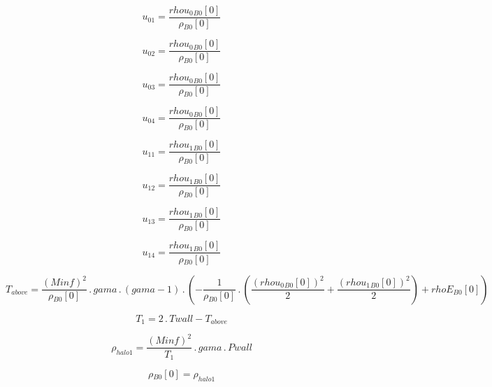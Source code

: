 \documentclass{article}
\begin{document}
\begin{dmath}u_{01} = \frac{{rhou_{0}{_{B0}}}[{0}]}{{\rho{_{B0}}}[{0}]}\end{dmath}

\begin{dmath}u_{02} = \frac{{rhou_{0}{_{B0}}}[{0}]}{{\rho{_{B0}}}[{0}]}\end{dmath}

\begin{dmath}u_{03} = \frac{{rhou_{0}{_{B0}}}[{0}]}{{\rho{_{B0}}}[{0}]}\end{dmath}

\begin{dmath}u_{04} = \frac{{rhou_{0}{_{B0}}}[{0}]}{{\rho{_{B0}}}[{0}]}\end{dmath}

\begin{dmath}u_{11} = \frac{{rhou_{1}{_{B0}}}[{0}]}{{\rho{_{B0}}}[{0}]}\end{dmath}

\begin{dmath}u_{12} = \frac{{rhou_{1}{_{B0}}}[{0}]}{{\rho{_{B0}}}[{0}]}\end{dmath}

\begin{dmath}u_{13} = \frac{{rhou_{1}{_{B0}}}[{0}]}{{\rho{_{B0}}}[{0}]}\end{dmath}

\begin{dmath}u_{14} = \frac{{rhou_{1}{_{B0}}}[{0}]}{{\rho{_{B0}}}[{0}]}\end{dmath}

\begin{dmath}T_{above} = \frac{\left(Minf \right)^{2}}{{\rho{_{B0}}}[{0}]} \,.\, gama \,.\, \left(gama - 1\right) \,.\, \left(- \frac{1}{{\rho{_{B0}}}[{0}]} \,.\, \left(\frac{\left({rhou_{0}{_{B0}}}[{0}] \right)^{2}}{2} + 
\frac{\left({rhou_{1}{_{B0}}}[{0}] \right)^{2}}{2}\right) + {rhoE{_{B0}}}[{0}]\right)\end{dmath}

\begin{dmath}T_{1} = 2 \,.\, Twall - T_{above}\end{dmath}

\begin{dmath}\rho_{halo 1} = \frac{\left(Minf \right)^{2}}{T_{1}} \,.\, gama \,.\, Pwall\end{dmath}

\begin{dmath}{\rho{_{B0}}}[{0}] = \rho_{halo 1}\end{dmath}
\end{document}
